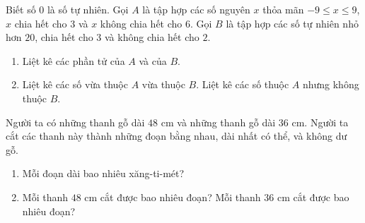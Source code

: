 \begin{bt} Biết số $0$ là số tự nhiên. Gọi $A$ là tập hợp các số nguyên $x$ thỏa mãn $-9\le x\le 9$, $x$ chia hết cho $3$ và $x$ không chia hết cho $6$. Gọi $B$ là tập hợp các số tự nhiên nhỏ hơn $20$, chia hết cho $3$ và không chia hết cho $2$.
	\begin{enumerate}
		\item Liệt kê các phần tử của $A$ và của $B$.
		\item Liệt kê các số vừa thuộc $A$ vừa thuộc $B$. Liệt kê các số thuộc $A$ nhưng không thuộc $B$.
	\end{enumerate}
\end{bt}

\begin{bt} Người ta có những thanh gỗ dài $48$ cm và những thanh gỗ dài $36$ cm. Người ta cắt các thanh này thành những đoạn bằng nhau, dài nhất có thể, và không dư gỗ.
	\begin{enumerate}
		\item Mỗi đoạn dài bao nhiêu xăng-ti-mét?
		\item Mỗi thanh $48$ cm cắt được bao nhiêu đoạn? Mỗi thanh $36$ cm cắt được bao nhiêu đoạn?
	\end{enumerate}
\end{bt}

